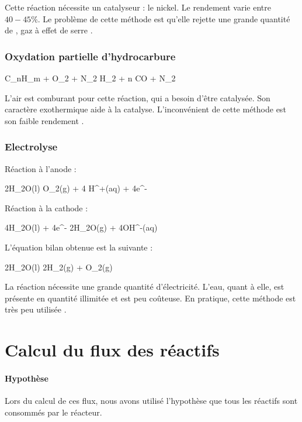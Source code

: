 			Cette réaction nécessite un catalyseur : le nickel. Le rendement varie
			entre $40-45\%$. Le problème de cette 
			méthode est qu'elle rejette une grande quantité de , 
			gaz à effet de serre \cite{wiki-h2}.
			
		\subsubsection{Oxydation partielle d'hydrocarbure}
		\begin{chemmath}
			C_nH_m +  O_2 +  N_2 \longrightarrow {} H_2 + n CO +  N_2
		\end{chemmath}
		L'air est comburant pour cette réaction, qui a besoin d'être catalysée.
		Son caractère exothermique aide à la catalyse. 
		L'inconvénient de cette méthode est son faible rendement \cite{wiki-h2}.

		\subsubsection{Electrolyse}
		Réaction à l'anode : 
		
		\begin{chemmath}
			2H_2O(l) \longrightarrow O_2(g) + 4 H^+(aq) + 4e^-
		\end{chemmath}
		
		Réaction à la cathode :
		
		\begin{chemmath}
			4H_2O(l) + 4e^- \longrightarrow 2H_2O(g) + 4OH^-(aq)
		\end{chemmath}
		
		L'équation bilan obtenue est la suivante :
		
		\begin{chemmath}
			2H_2O(l) \longrightarrow 2H_2(g) + O_2(g)
		\end{chemmath}
		
	La réaction nécessite une grande quantité d'électricité. L'eau, quant à elle, 
	est présente en quantité illimitée 
	et est peu coûteuse. En pratique, cette méthode est très peu utilisée \cite{wiki-h2}.

\section{Calcul du flux des réactifs}
\paragraph{Hypothèse}
Lors du calcul de ces flux, nous avons utilisé l'hypothèse que 
tous les réactifs sont 
consommés par le réacteur.


